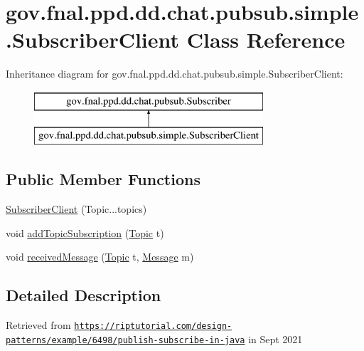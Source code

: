 \hypertarget{classgov_1_1fnal_1_1ppd_1_1dd_1_1chat_1_1pubsub_1_1simple_1_1SubscriberClient}{\section{gov.\-fnal.\-ppd.\-dd.\-chat.\-pubsub.\-simple.\-Subscriber\-Client Class Reference}
\label{classgov_1_1fnal_1_1ppd_1_1dd_1_1chat_1_1pubsub_1_1simple_1_1SubscriberClient}
}
Inheritance diagram for gov.\-fnal.\-ppd.\-dd.\-chat.\-pubsub.\-simple.\-Subscriber\-Client\-:\begin{figure}[H]
\begin{center}
\leavevmode
\includegraphics[height=2.000000cm]{classgov_1_1fnal_1_1ppd_1_1dd_1_1chat_1_1pubsub_1_1simple_1_1SubscriberClient}
\end{center}
\end{figure}
\subsection*{Public Member Functions}
\begin{DoxyCompactItemize}
\item 
\hyperlink{classgov_1_1fnal_1_1ppd_1_1dd_1_1chat_1_1pubsub_1_1simple_1_1SubscriberClient_aa69851fc0d56773568b171acc94d57e2}{Subscriber\-Client} (Topic...\-topics)
\item 
void \hyperlink{classgov_1_1fnal_1_1ppd_1_1dd_1_1chat_1_1pubsub_1_1simple_1_1SubscriberClient_a595ea21c9ab4b007c9291876d5b7cd22}{add\-Topic\-Subscription} (\hyperlink{classgov_1_1fnal_1_1ppd_1_1dd_1_1chat_1_1pubsub_1_1Topic}{Topic} t)
\item 
void \hyperlink{classgov_1_1fnal_1_1ppd_1_1dd_1_1chat_1_1pubsub_1_1simple_1_1SubscriberClient_a0f67ce21161ccc7cf6248af772ffc494}{received\-Message} (\hyperlink{classgov_1_1fnal_1_1ppd_1_1dd_1_1chat_1_1pubsub_1_1Topic}{Topic} t, \hyperlink{interfacegov_1_1fnal_1_1ppd_1_1dd_1_1chat_1_1pubsub_1_1Message}{Message} m)
\end{DoxyCompactItemize}


\subsection{Detailed Description}
Retrieved from \href{https://riptutorial.com/design-patterns/example/6498/publish-subscribe-in-java}{\tt https\-://riptutorial.\-com/design-\/patterns/example/6498/publish-\/subscribe-\/in-\/java} in Sept 2021

